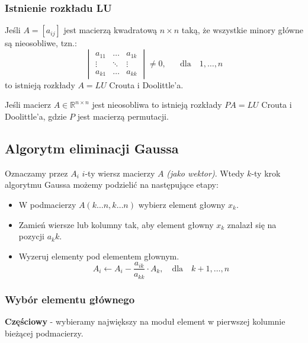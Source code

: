 \documentclass[../mn-notatki.tex]{subfiles}
\begin{document}
\subsubsection{Istnienie rozkładu LU}

\begin{tcolorbox}
Jeśli $A = [a_{ij}]$ jest macierzą kwadratową $n\times n$ taką, że wszystkie
minory główne są nieosobliwe, tzn.:
\[
\begin{vmatrix}
a_{11} & \ldots & a_{1k}\\
\vdots & \ddots & \vdots\\
a_{k1} & \ldots & a_{kk}
\end{vmatrix} \neq 0, \text{~~~~~dla~~~} 1,\ldots,n
\]
to istnieją rozkłady $A = LU$ Crouta i Doolittle'a.
\end{tcolorbox}
\begin{tcolorbox}
Jeśli macierz $A \in \mathbb{R}^{n\times n}$ jest nieosobliwa to istnieją
rozkłady $PA = LU$ Crouta i Doolittle'a, gdzie $P$ jest macierzą permutacji.
\end{tcolorbox}

\subsection{Algorytm eliminacji Gaussa}

Oznaczamy przez $A_i$ $i$-ty wiersz macierzy $A$ \textit{(jako wektor)}.
Wtedy $k$-ty krok algorytmu Gaussa możemy podzielić na następujące etapy:
\begin{itemize}
    \item W podmacierzy $A(k\ldots n, k\ldots n)$ wybierz element głowny $x_k$.
    \item Zamień wiersze lub kolumny tak, aby element głowny $x_k$ znalazł się
    na pozycji $a_kk$.
    \item Wyzeruj elementy pod elementem głownym.
    \[
    A_i \leftarrow A_i - \frac{a_{ik}}{a_{kk}} \cdot A_k, \text{~~ dla ~~} k+1, \ldots, n
    \]
\end{itemize}

\subsubsection{Wybór elementu głównego}

\begin{tcolorbox}
\textbf{Częściowy} - wybieramy największy na moduł element w pierwszej kolumnie
bieżącej podmacierzy.
\end{tcolorbox}
\end{document}
